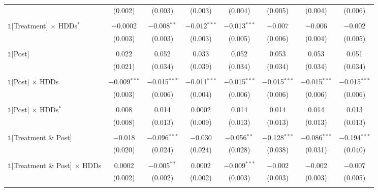 {\begin{table}[t!]
\begin{adjustbox}{scale = 0.75}
\begin{threeparttable}
\begin{tabular}{@{\extracolsep{10pt}}lccccccc}
                    & (0.002) & (0.003) & (0.003) & (0.004) & (0.005) & (0.004) & (0.006) \\
                    & & & & & & & \\
                    $\mathbb{1}$[Treatment] $\times$ HDDs$^{*}$ & $-$0.0002 & $-$0.008$^{**}$ & $-$0.012$^{***}$ & $-$0.013$^{***}$ & $-$0.007 & $-$0.006 & $-$0.002 \\
                    & (0.003) & (0.003) & (0.003) & (0.005) & (0.006) & (0.004) & (0.005) \\
                    & & & & & & & \\
                    $\mathbb{1}$[Post] & 0.022 & 0.052 & 0.033 & 0.052 & 0.053 & 0.053 & 0.051 \\
                    & (0.021) & (0.034) & (0.039) & (0.034) & (0.034) & (0.034) & (0.034) \\
                    & & & & & & & \\
                    $\mathbb{1}$[Post] $\times$ HDDs & $-$0.009$^{***}$ & $-$0.015$^{***}$ & $-$0.011$^{***}$ & $-$0.015$^{***}$ & $-$0.015$^{***}$ & $-$0.015$^{***}$ & $-$0.015$^{***}$ \\
                    & (0.003) & (0.006) & (0.004) & (0.006) & (0.006) & (0.006) & (0.006) \\
                    & & & & & & & \\
                    $\mathbb{1}$[Post] $\times$ HDDs$^{*}$ & 0.008 & 0.014 & 0.0002 & 0.014 & 0.014 & 0.014 & 0.013 \\
                    & (0.008) & (0.013) & (0.009) & (0.013) & (0.013) & (0.013) & (0.013) \\
                    & & & & & & & \\
                    $\mathbb{1}$[Treatment \& Post] & $-$0.018 & $-$0.096$^{***}$ & $-$0.030 & $-$0.056$^{**}$ & $-$0.128$^{***}$ & $-$0.086$^{***}$ & $-$0.194$^{***}$ \\
                    & (0.020) & (0.024) & (0.024) & (0.028) & (0.038) & (0.031) & (0.040) \\
                    & & & & & & & \\
                    $\mathbb{1}$[Treatment \& Post] $\times$ HDDs & 0.0002 & $-$0.005$^{**}$ & 0.0002 & $-$0.009$^{***}$ & $-$0.002 & $-$0.002 & $-$0.007 \\
                    & (0.002) & (0.002) & (0.002) & (0.003) & (0.003) & (0.003) & (0.005) \\
                    & & & & & & & \\

\end{tabular}
\end{threeparttable}
\end{adjustbox}
\end{table}}
